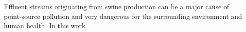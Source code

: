 Effluent streams originating from swine production can be a major cause of point-source pollution and very dangerous for the surrounding environment and human health. In this work